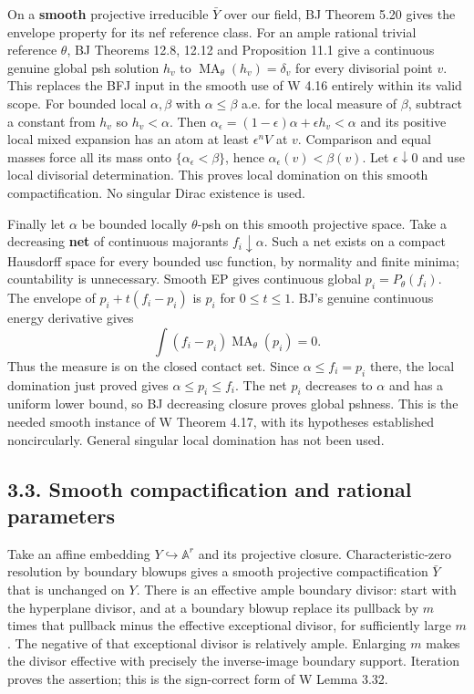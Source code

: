 \documentclass[
  11pt,
]{article}
\begin{document}
On a \textbf{smooth} projective irreducible \(\bar Y\) over our field,
BJ Theorem 5.20 gives the envelope property for its nef reference class.
For an ample rational trivial reference \(\theta\), BJ Theorems 12.8,
12.12 and Proposition 11.1 give a continuous genuine global psh solution
\(h_v\) to \(\operatorname{MA}_\theta(h_v)=\delta_v\) for every
divisorial point \(v\). This replaces the BFJ input in the smooth use of
W 4.16 entirely within its valid scope. For bounded local
\(\alpha,\beta\) with \(\alpha\leq\beta\) a.e. for the local measure of
\(\beta\), subtract a constant from \(h_v\) so \(h_v<\alpha\). Then
\(\alpha_\epsilon=(1-\epsilon)\alpha+\epsilon h_v<\alpha\) and its
positive local mixed expansion has an atom at least \(\epsilon^n V\) at
\(v\). Comparison and equal masses force all its mass onto
\(\{\alpha_\epsilon<\beta\}\), hence \(\alpha_\epsilon(v)<\beta(v)\).
Let \(\epsilon\downarrow0\) and use local divisorial determination. This
proves local domination on this smooth compactification. No singular
Dirac existence is used.

Finally let \(\alpha\) be bounded locally \(\theta\)-psh on this smooth
projective space. Take a decreasing \textbf{net} of continuous majorants
\(f_i\downarrow\alpha\). Such a net exists on a compact Hausdorff space
for every bounded usc function, by normality and finite minima;
countability is unnecessary. Smooth EP gives continuous global
\(p_i=P_\theta(f_i)\). The envelope of \(p_i+t(f_i-p_i)\) is \(p_i\) for
\(0\leq t\leq1\). BJ's genuine continuous energy derivative gives
\[\int(f_i-p_i)\operatorname{MA}_\theta(p_i)=0.\] Thus the measure is on
the closed contact set. Since \(\alpha\leq f_i=p_i\) there, the local
domination just proved gives \(\alpha\leq p_i\leq f_i\). The net \(p_i\)
decreases to \(\alpha\) and has a uniform lower bound, so BJ decreasing
closure proves global pshness. This is the needed smooth instance of W
Theorem 4.17, with its hypotheses established noncircularly. General
singular local domination has not been used.

\subsection{3.3. Smooth compactification and rational
parameters}\label{smooth-compactification-and-rational-parameters}

Take an affine embedding \(Y\hookrightarrow\mathbb A^r\) and its
projective closure. Characteristic-zero resolution by boundary blowups
gives a smooth projective compactification \(\bar Y\) that is unchanged
on \(Y\). There is an effective ample boundary divisor: start with the
hyperplane divisor, and at a boundary blowup replace its pullback by
\(m\) times that pullback minus the effective exceptional divisor, for
sufficiently large \(m\). The negative of that exceptional divisor is
relatively ample. Enlarging \(m\) makes the divisor effective with
precisely the inverse-image boundary support. Iteration proves the
assertion; this is the sign-correct form of W Lemma 3.32.
\end{document}
